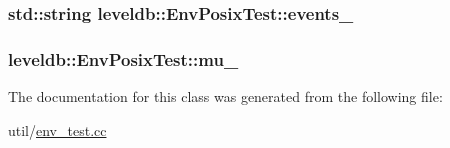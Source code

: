 \subsubsection[{events\+\_\+}]{\setlength{\rightskip}{0pt plus 5cm}std\+::string leveldb\+::\+Env\+Posix\+Test\+::events\+\_\+\hspace{0.3cm}{\ttfamily [private]}}\label{classleveldb_1_1_env_posix_test_abb78ea3ef0450a24c05560e1480d0660}
\hypertarget{classleveldb_1_1_env_posix_test_ab285153bfecbfb0be8a2fa247e46d6e8}{}
\subsubsection[{mu\+\_\+}]{ leveldb\+::\+Env\+Posix\+Test\+::mu\+\_\+\hspace{0.3cm}{\ttfamily [private]}}\label{classleveldb_1_1_env_posix_test_ab285153bfecbfb0be8a2fa247e46d6e8}


The documentation for this class was generated from the following file\+:\begin{DoxyCompactItemize}
\item 
util/\hyperlink{env__test_8cc}{env\+\_\+test.\+cc}\end{DoxyCompactItemize}
